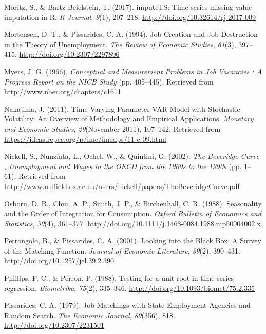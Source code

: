 \documentclass[12pt,oneside]{reedthesis}
\begin{document}
\leavevmode\hypertarget{ref-Moritz2017}{}%
Moritz, S., \& Bartz-Beielstein, T. (2017). imputeTS: Time series missing value imputation in R. \emph{R Journal}, \emph{9}(1), 207--218. \url{http://doi.org/10.32614/rj-2017-009}

\leavevmode\hypertarget{ref-Mortensen1994}{}%
Mortensen, D. T., \& Pissarides, C. A. (1994). Job Creation and Job Destruction in the Theory of Unemployment. \emph{The Review of Economic Studies}, \emph{61}(3), 397--415. \url{http://doi.org/10.2307/2297896}

\leavevmode\hypertarget{ref-Myers1966}{}%
Myers, J. G. (1966). \emph{Conceptual and Measurement Problems in Job Vacancies : A Progress Report on the NICB Study} (pp. 405--445). Retrieved from \url{http://www.nber.org/chapters/c1611}

\leavevmode\hypertarget{ref-Nakajima2011}{}%
Nakajima, J. (2011). Time-Varying Parameter VAR Model with Stochastic Volatility: An Overview of Methodology and Empirical Applications. \emph{Monetary and Economic Studies}, \emph{29}(November 2011), 107--142. Retrieved from \url{https://ideas.repec.org/p/ime/imedps/11-e-09.html}

\leavevmode\hypertarget{ref-Nickell2002}{}%
Nickell, S., Nunziata, L., Ochel, W., \& Quintini, G. (2002). \emph{The Beveridge Curve , Unemployment and Wages in the OECD from the 1960s to the 1990s} (pp. 1--61). Retrieved from \url{http://www.nuffield.ox.ac.uk/users/nickell/papers/TheBeveridgeCurve.pdf}

\leavevmode\hypertarget{ref-Osborn1988}{}%
Osborn, D. R., Chui, A. P., Smith, J. P., \& Birchenhall, C. R. (1988). Seasonality and the Order of Integration for Consumption. \emph{Oxford Bulletin of Economics and Statistics}, \emph{50}(4), 361--377. \url{http://doi.org/10.1111/j.1468-0084.1988.mp50004002.x}

\leavevmode\hypertarget{ref-Petrongolo2001}{}%
Petrongolo, B., \& Pissarides, C. A. (2001). Looking into the Black Box: A Survey of the Matching Function. \emph{Journal of Economic Literature}, \emph{39}(2), 390--431. \url{http://doi.org/10.1257/jel.39.2.390}

\leavevmode\hypertarget{ref-PhillipsPerron1988}{}%
Phillips, P. C., \& Perron, P. (1988). Testing for a unit root in time series regression. \emph{Biometrika}, \emph{75}(2), 335--346. \url{http://doi.org/10.1093/biomet/75.2.335}

\leavevmode\hypertarget{ref-Pissarides1979}{}%
Pissarides, C. A. (1979). Job Matchings with State Employment Agencies and Random Search. \emph{The Economic Journal}, \emph{89}(356), 818. \url{http://doi.org/10.2307/2231501}
\end{document}
